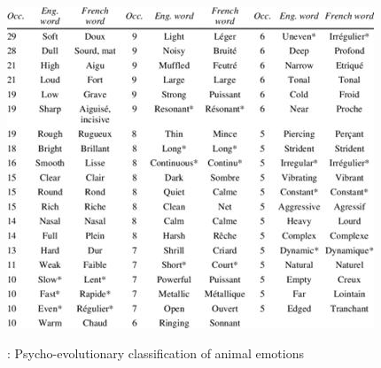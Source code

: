 \begin{cent\idx{scent}er}
	\includegraphics[scale=0.7]{./Images/timbre.jpg}
\end{cent\idx{scent}er}



: Psycho-evolutionary classification of animal emotions 




\pagebreak

\pagebreak








